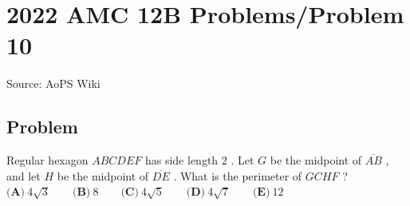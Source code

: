 \documentclass[12pt]{article}
\begin{document}
\section*{{2022 AMC 12B Problems/Problem 10}}
Source: AoPS Wiki

\subsection*{Problem}
Regular hexagon $ABCDEF$ has side length $2$ . Let $G$ be the midpoint of $\overline{AB}$ , and let $H$ be the midpoint of $\overline{DE}$ . What is the perimeter of $GCHF$ ? $\textbf{(A)}\ 4\sqrt3 \qquad \textbf{(B)}\ 8 \qquad \textbf{(C)}\ 4\sqrt5 \qquad \textbf{(D)}\ 4\sqrt7 \qquad \textbf{(E)}\ 12$
\end{document}

